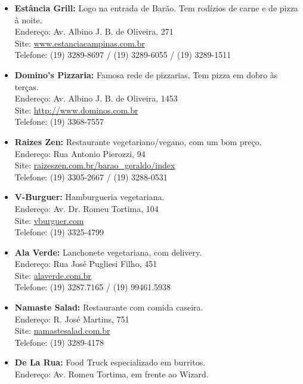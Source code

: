 \begin{itemize}
    \item   \textbf{Estância Grill:} Logo na entrada de Barão. Tem rodízios de
        carne e de pizza à noite.
        \\Endereço: Av. Albino J. B. de Oliveira, 271
        \\Site: \url{www.estanciacampinas.com.br}
        \\Telefone: (19) 3289-8697 / (19) 3289-6055 / (19) 3289-1511

    \item   \textbf{Domino's Pizzaria:} Famosa rede de pizzarias. Tem pizza
        em dobro às terças.
        \\Endereço: Av. Albino J. B. de Oliveira, 1453
        \\Site: \url{http://www.dominos.com.br}
        \\Telefone: (19) 3368-7557

    \item   \textbf{Raizes Zen:} Restaurante vegetariano/vegano, com um bom
	preço.
	\\Endereço: Rua Antonio Pierozzi, 94
	\\Site: \url{raizeszen.com.br/barao_geraldo/index}
	\\Telefone: (19) 3305-2667 / (19) 3288-0531

    \item   \textbf{V-Burguer:} Hamburgueria vegetariana.
	\\Endereço: Av. Dr. Romeu Tortima, 104
	\\Site: \url{vburguer.com}
	\\Telefone: (19) 3325-4799
	
    \item   \textbf{Ala Verde:} Lanchonete vegetariana, com delivery.
	\\Endereço: Rua José Pugliesi Filho, 451
	\\Site: \url{alaverde.com.br}
	\\Telefone: (19) 3287.7165 / (19) 99461.5938
	
     \item   \textbf{Namaste Salad:} Restaurante com comida caseira.
	\\Endereço: R. José Martins, 751
	\\Site: \url{namastesalad.com.br}
	\\Telefone: (19) 3289-4178

    \item   \textbf{De La Rua:} Food Truck especializado em burritos.
	\\Endereço: Av. Romeu Tortima, em frente ao Wizard.
	

\end{itemize}
